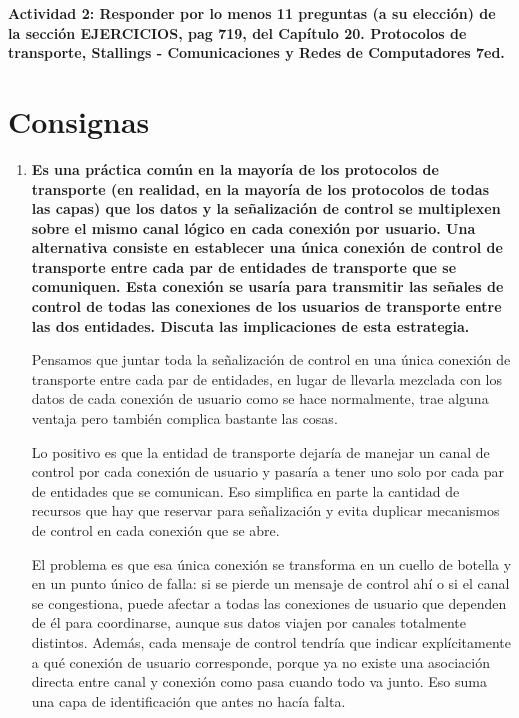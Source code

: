 \documentclass[11pt,a4paper]{article}
\begin{document}
\begin{enumerate}[label=20.\arabic*, start=1, itemsep=0.3cm]
\end{enumerate}
\textbf{Actividad 2: Responder por lo menos 11 preguntas (a su elección) de la sección EJERCICIOS, pag 719, del Capítulo 20. Protocolos de transporte, Stallings - Comunicaciones y Redes de Computadores 7ed.}

\section{Consignas}

\begin{enumerate}
    \item[\textbf{20.1}] \textbf{Es una práctica común en la mayoría de los protocolos de transporte (en realidad, en la mayoría de los protocolos de todas las capas) que los datos y la señalización de control se multiplexen sobre el mismo canal lógico en cada conexión por usuario. Una alternativa consiste en establecer una única conexión de control de transporte entre cada par de entidades de transporte que se comuniquen. Esta conexión se usaría para transmitir las señales de control de todas las conexiones de los usuarios de transporte entre las dos entidades. Discuta las implicaciones de esta estrategia.}

    Pensamos que juntar toda la señalización de control en una única conexión de transporte entre cada par de entidades, en lugar de llevarla mezclada con los datos de cada conexión de usuario como se hace normalmente, trae alguna ventaja pero también complica bastante las cosas.

    Lo positivo es que la entidad de transporte dejaría de manejar un canal de control por cada conexión de usuario y pasaría a tener uno solo por cada par de entidades que se comunican. Eso simplifica en parte la cantidad de recursos que hay que reservar para señalización y evita duplicar mecanismos de control en cada conexión que se abre.

    El problema es que esa única conexión se transforma en un cuello de botella y en un punto único de falla: si se pierde un mensaje de control ahí o si el canal se congestiona, puede afectar a todas las conexiones de usuario que dependen de él para coordinarse, aunque sus datos viajen por canales totalmente distintos. Además, cada mensaje de control tendría que indicar explícitamente a qué conexión de usuario corresponde, porque ya no existe una asociación directa entre canal y conexión como pasa cuando todo va junto. Eso suma una capa de identificación que antes no hacía falta.


\end{enumerate}
\end{document}

